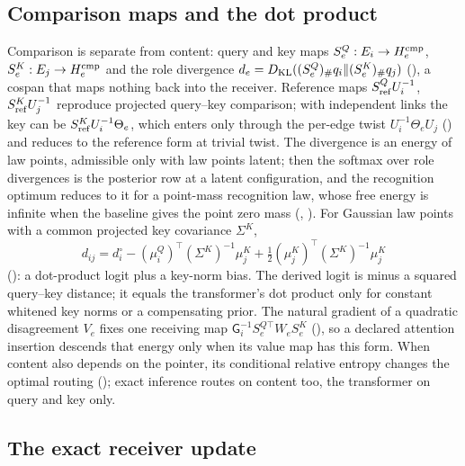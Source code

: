 \subsection{Comparison maps and the dot product}
\label{comp:ch06-comparison}

Comparison is separate from content: query and key maps $S^Q_e:E_i\to H^{\rm cmp}_e$, $S^K_e:E_j\to H^{\rm cmp}_e$ and the
role divergence $d_e=D_{\mathrm{KL}}((S^Q_e)_\#q_i\Vert(S^K_e)_\#q_j)$ (), a cospan that maps nothing
back into the receiver. Reference maps $S^Q_{\rm ref}U_i^{-1}$, $S^K_{\rm ref}U_j^{-1}$ reproduce projected query--key
comparison; with independent links the key can be $S^K_{\rm ref}U_i^{-1}\Theta_e$, which enters only through the per-edge
twist $U_i^{-1}\Theta_eU_j$ () and reduces to the reference form at trivial twist. The
divergence is an energy of law points, admissible only with law points latent; then the softmax over role divergences is
the posterior row at a latent configuration, and the recognition optimum reduces to it for a point-mass recognition
law, whose free energy is infinite when the baseline gives the point zero mass (, ). For Gaussian law points
with a common projected key covariance $\Sigma^K$,
\[
d_{ij}=d_i^\circ-(\mu^Q_i)^\top(\Sigma^K)^{-1}\mu^K_j+\tfrac12(\mu^K_j)^\top(\Sigma^K)^{-1}\mu^K_j
\]
(): a dot-product logit plus a key-norm bias. The derived logit is minus a squared
query--key distance; it equals the transformer's dot product only for constant whitened key norms or a compensating
prior. The natural gradient of a quadratic disagreement $V_e$ fixes one receiving map
$\mathsf G_i^{-1}S^{Q\top}_eW_eS^K_e$ (), so a declared attention insertion descends that
energy only when its value map has this form. When content also depends on the pointer, its conditional relative
entropy changes the optimal routing (); exact inference routes on content too, the
transformer on query and key only.

\subsection{The exact receiver update}
\label{comp:ch06-receiver}

